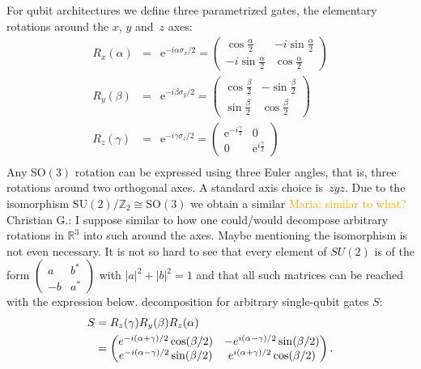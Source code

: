 \documentclass[aps,pra,10pt,twocolumn,groupedaddress,nofootinbib]{revtex4-1}
\theoremstyle{plain}
\newcommand{\isom}{\cong} %
\newcommand{\bpm}{\begin{pmatrix}}
\newcommand{\epm}{\end{pmatrix}}
\newcommand{\Z}{\ensuremath{\mathbb Z}}  %
\newcommand{\SO}{\text{SO}} %
\newcommand{\SU}{\text{SU}} %
\newcommand{\e}{\mathrm{e}}
\newcommand{\maria}[1]{\textcolor{orange}{Maria: #1}}
\newcommand{\cg}[1]{\textcolor{cyan!80!black}{Christian G.: #1}}
\begin{document}
For qubit architectures we define three parametrized gates,
the elementary rotations around the $x$, $y$ and~$z$ axes:
\begin{eqnarray*}
        R_x(\alpha) &=& \e^{-i\alpha \sigma_x/2} =
        \begin{pmatrix}
          \cos \frac{\alpha}{2} & -i \sin \frac{\alpha}{2}\\
          -i \sin \frac{\alpha}{2} & \cos \frac{\alpha}{2}
        \end{pmatrix}\\
        R_y(\beta) &=& \e^{-i\beta \sigma_y/2} =
        \begin{pmatrix}
          \cos \frac{\beta}{2} & -\sin \frac{\beta}{2}\\
          \sin \frac{\beta}{2} & \cos \frac{\beta}{2}
        \end{pmatrix}\\
        R_z(\gamma) &=& \e^{-i\gamma \sigma_z/2}=
        \begin{pmatrix}
          \e^{-i \frac{\gamma}{2}} & 0\\
          0 & \e^{i \frac{\gamma}{2}}
        \end{pmatrix}\\
\end{eqnarray*}
Any $\SO(3)$ rotation can be expressed using three Euler angles, that is, three rotations around two orthogonal axes. A standard axis choice is~$zyz$. Due to the isomorphism $\SU(2)/\Z_2 \isom \SO(3)$ we obtain a similar \maria{similar to what?} \cg{I suppose similar to how one could/would decompose arbitrary rotations in $\mathbb R^3$ into such around the axes. Maybe mentioning the isomorphism is not even necessary. It is not so hard to see that every element of $SU(2)$ is of the form $
  \begin{pmatrix}
    a & b^*\\
    -b & a^*
  \end{pmatrix}
$ with $|a|^2 + |b|^2 = 1$ and that all such matrices can be reached with the expression below.} decomposition
for arbitrary single-qubit gates $S$:
\begin{align}
\label{eq:app:euler}
\notag
S &= R_z(\gamma) R_y(\beta) R_z(\alpha)\\
&=
\bpm
e^{-i(\alpha+\gamma)/2} \cos(\beta/2) & -e^{i(\alpha-\gamma)/2} \sin(\beta/2)\\
e^{-i(\alpha-\gamma)/2} \sin(\beta/2) &  e^{i(\alpha+\gamma)/2} \cos(\beta/2)
\epm.
\end{align}
\end{document}
